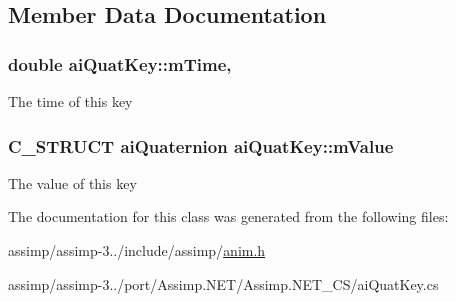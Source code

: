 \subsection{Member Data Documentation}
\hypertarget{structai_quat_key_afb56b697e491c918bdeb1b32d03bbcf8}{
\subsubsection[{m\+Time}]{\setlength{\rightskip}{0pt plus 5cm}double ai\+Quat\+Key\+::m\+Time\hspace{0.3cm}{\ttfamily [get]}, {\ttfamily [set]}}}\label{structai_quat_key_afb56b697e491c918bdeb1b32d03bbcf8}
The time of this key \hypertarget{structai_quat_key_a08bf706065137951fd89c5914bb5a2aa}{
\subsubsection[{m\+Value}]{\setlength{\rightskip}{0pt plus 5cm}C\+\_\+\+S\+T\+R\+U\+C\+T {\bf ai\+Quaternion} ai\+Quat\+Key\+::m\+Value}}\label{structai_quat_key_a08bf706065137951fd89c5914bb5a2aa}
The value of this key 

The documentation for this class was generated from the following files\+:\begin{DoxyCompactItemize}
\item 
assimp/assimp-\/3../include/assimp/\hyperlink{anim_8h}{anim.\+h}\item 
assimp/assimp-\/3../port/\+Assimp.\+N\+E\+T/\+Assimp.\+N\+E\+T\+\_\+\+C\+S/ai\+Quat\+Key.\+cs\end{DoxyCompactItemize}
